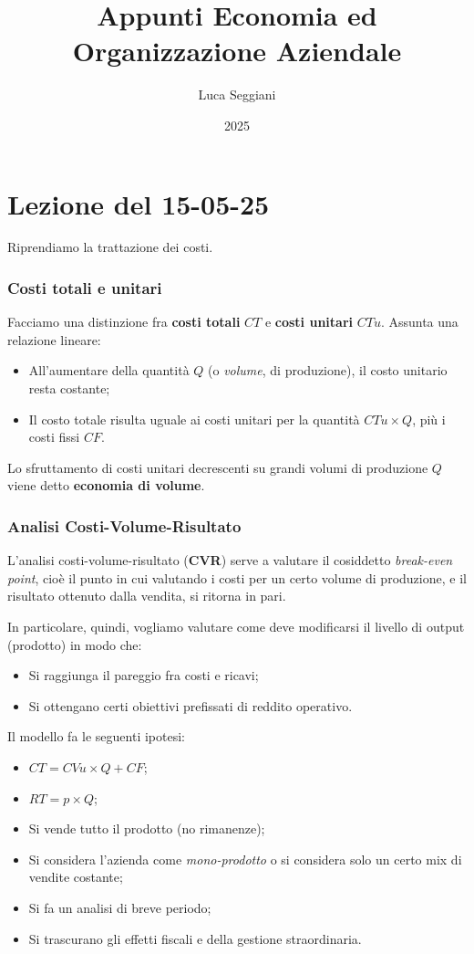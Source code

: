 \documentclass[a4paper,11pt]{article}
\title{Appunti Economia ed Organizzazione Aziendale}
\author{Luca Seggiani}
\date{2025}
\begin{document}
\section{Lezione del 15-05-25}

\thispagestyle{empty}
\pagestyle{fancy}

Riprendiamo la trattazione dei costi.

\subsubsection{Costi totali e unitari}
Facciamo una distinzione fra \textbf{costi totali} $CT$ e \textbf{costi unitari} $CTu$.
Assunta una relazione lineare:
\begin{itemize}
	\item All'aumentare della quantità $Q$ (o \textit{volume}, di produzione), il costo unitario resta costante;
	\item Il costo totale risulta uguale ai costi unitari per la quantità $CTu \times Q$, più i costi fissi $CF$.
\end{itemize}

Lo sfruttamento di costi unitari decrescenti su grandi volumi di produzione $Q$ viene detto \textbf{economia di volume}.

\subsubsection{Analisi Costi-Volume-Risultato}
L'analisi costi-volume-risultato (\textbf{CVR}) serve a valutare il cosiddetto \textit{break-even point}, cioè il punto in cui valutando i costi per un certo volume di produzione, e il risultato ottenuto dalla vendita, si ritorna in pari.

In particolare, quindi, vogliamo valutare come deve modificarsi il livello di output (prodotto) in modo che:
\begin{itemize}
	\item Si raggiunga il pareggio fra costi e ricavi;
	\item Si ottengano certi obiettivi prefissati di reddito operativo.
\end{itemize}

Il modello fa le seguenti ipotesi:
\begin{itemize}
	\item $CT = CVu \times Q + CF$;
	\item $RT = p \times Q$;
	\item Si vende tutto il prodotto (no rimanenze);
	\item Si considera l'azienda come \textit{mono-prodotto} o si considera solo un certo mix di vendite costante;
	\item Si fa un analisi di breve periodo;
	\item Si trascurano gli effetti fiscali e della gestione straordinaria.
\end{itemize}
\end{document}

